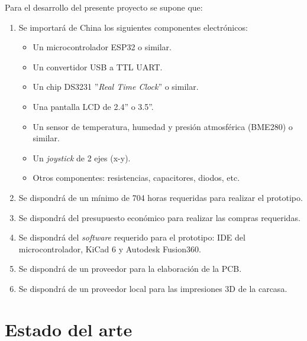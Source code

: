 Para el desarrollo del presente proyecto se supone que:
\begin{enumerate}
\item Se importará de China los siguientes componentes electrónicos:
	\begin{itemize}
	\item Un microcontrolador ESP32 o similar.
	\item Un convertidor USB a TTL UART.
	\item Un chip DS3231 ''\textit{Real Time Clock}'' o similar.
	\item Una pantalla LCD de 2.4'' o 3.5''.
	\item Un sensor de temperatura, humedad y presión atmosférica (BME280) o similar.
	\item Un \textit{joystick} de 2 ejes (x-y).
	\item Otros componentes: resistencias, capacitores, diodos, etc.
	\end{itemize}	
\item Se dispondrá de un mínimo de 704 horas requeridas para realizar el prototipo.
\item Se dispondrá del presupuesto económico para realizar las compras requeridas.
\item Se dispondrá del \textit{software} requerido para el prototipo: IDE del microcontrolador, KiCad 6 y Autodesk Fusion360.
\item Se dispondrá de un proveedor para la elaboración de la PCB.
\item Se dispondrá de un proveedor local para las impresiones 3D de la carcasa.
\end{enumerate}

\newpage
\section{Estado del arte}

